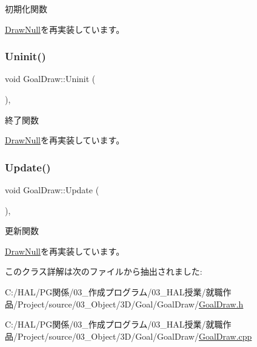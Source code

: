 初期化関数 



\mbox{\hyperlink{class_draw_null_acd7fef3ccea1da537ac9507ffbb6dd2e}{Draw\+Null}}を再実装しています。

\mbox{\label{class_goal_draw_a01318a0606848a3ca8ca7b7acbf4df24}} 
\subsubsection{\texorpdfstring{Uninit()}{Uninit()}}
{\footnotesize\ttfamily void Goal\+Draw\+::\+Uninit (\begin{DoxyParamCaption}{ }\end{DoxyParamCaption})\hspace{0.3cm}{\ttfamily [override]}, {\ttfamily [virtual]}}



終了関数 



\mbox{\hyperlink{class_draw_null_a12d44e341c7364b5ab9cdd661dc16187}{Draw\+Null}}を再実装しています。

\mbox{\label{class_goal_draw_a6e003277ed44eb9c800a616b6acbcb20}} 
\subsubsection{\texorpdfstring{Update()}{Update()}}
{\footnotesize\ttfamily void Goal\+Draw\+::\+Update (\begin{DoxyParamCaption}{ }\end{DoxyParamCaption})\hspace{0.3cm}{\ttfamily [override]}, {\ttfamily [virtual]}}



更新関数 



\mbox{\hyperlink{class_draw_null_a0149bcf84a34b138642ab7975ae46f30}{Draw\+Null}}を再実装しています。



このクラス詳解は次のファイルから抽出されました\+:\begin{DoxyCompactItemize}
\item 
C\+:/\+H\+A\+L/\+P\+G関係/03\+\_\+作成プログラム/03\+\_\+\+H\+A\+L授業/就職作品/\+Project/source/03\+\_\+\+Object/3\+D/\+Goal/\+Goal\+Draw/\mbox{\hyperlink{_goal_draw_8h}{Goal\+Draw.\+h}}\item 
C\+:/\+H\+A\+L/\+P\+G関係/03\+\_\+作成プログラム/03\+\_\+\+H\+A\+L授業/就職作品/\+Project/source/03\+\_\+\+Object/3\+D/\+Goal/\+Goal\+Draw/\mbox{\hyperlink{_goal_draw_8cpp}{Goal\+Draw.\+cpp}}\end{DoxyCompactItemize}
